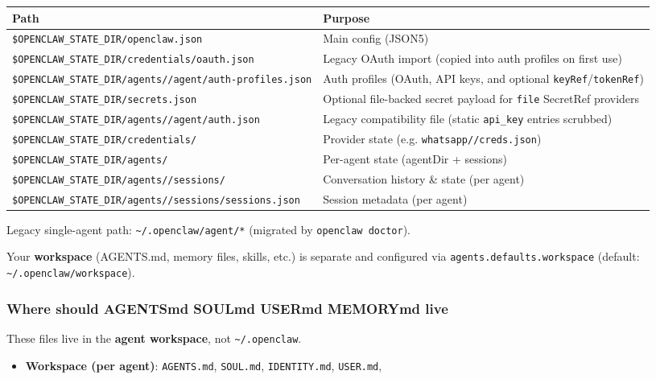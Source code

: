 \begin{table}[h]
\centering
\small
\begin{tabular}{|l|l|}
\hline
Path & Purpose \\
\hline
\texttt{\$OPENCLAW\_STATE\_DIR/openclaw.json} & Main config (JSON5) \\
\hline
\texttt{\$OPENCLAW\_STATE\_DIR/credentials/oauth.json} & Legacy OAuth import (copied into auth profiles on first use) \\
\hline
\texttt{\$OPENCLAW\_STATE\_DIR/agents//agent/auth-profiles.json} & Auth profiles (OAuth, API keys, and optional \texttt{keyRef}/\texttt{tokenRef}) \\
\hline
\texttt{\$OPENCLAW\_STATE\_DIR/secrets.json} & Optional file-backed secret payload for \texttt{file} SecretRef providers \\
\hline
\texttt{\$OPENCLAW\_STATE\_DIR/agents//agent/auth.json} & Legacy compatibility file (static \texttt{api\_key} entries scrubbed) \\
\hline
\texttt{\$OPENCLAW\_STATE\_DIR/credentials/} & Provider state (e.g. \texttt{whatsapp//creds.json}) \\
\hline
\texttt{\$OPENCLAW\_STATE\_DIR/agents/} & Per-agent state (agentDir + sessions) \\
\hline
\texttt{\$OPENCLAW\_STATE\_DIR/agents//sessions/} & Conversation history \& state (per agent) \\
\hline
\texttt{\$OPENCLAW\_STATE\_DIR/agents//sessions/sessions.json} & Session metadata (per agent) \\
\hline
\end{tabular}
\end{table}



Legacy single-agent path: \texttt{\textasciitilde{}/.openclaw/agent/*} (migrated by \texttt{openclaw doctor}).

Your \textbf{workspace} (AGENTS.md, memory files, skills, etc.) is separate and configured via \texttt{agents.defaults.workspace} (default: \texttt{\textasciitilde{}/.openclaw/workspace}).

\subsubsection{Where should AGENTSmd SOULmd USERmd MEMORYmd live}


These files live in the \textbf{agent workspace}, not \texttt{\textasciitilde{}/.openclaw}.

\begin{itemize}
  \item \textbf{Workspace (per agent)}: \texttt{AGENTS.md}, \texttt{SOUL.md}, \texttt{IDENTITY.md}, \texttt{USER.md},
\end{itemize}

